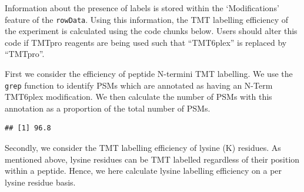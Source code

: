 \documentclass[9pt,a4paper,]{extarticle}
\newenvironment{Shaded}{\begin{snugshade}}{\end{snugshade}}
\newcommand{\AttributeTok}[1]{\textcolor[rgb]{0.77,0.63,0.00}{#1}}
\newcommand{\DecValTok}[1]{\textcolor[rgb]{0.00,0.00,0.81}{#1}}
\newcommand{\DocumentationTok}[1]{\textcolor[rgb]{0.56,0.35,0.01}{\textbf{\textit{#1}}}}
\newcommand{\FunctionTok}[1]{\textcolor[rgb]{0.00,0.00,0.00}{#1}}
\newcommand{\NormalTok}[1]{#1}
\newcommand{\OtherTok}[1]{\textcolor[rgb]{0.56,0.35,0.01}{#1}}
\newcommand{\SpecialCharTok}[1]{\textcolor[rgb]{0.00,0.00,0.00}{#1}}
\newcommand{\StringTok}[1]{\textcolor[rgb]{0.31,0.60,0.02}{#1}}
\begin{document}
Information about the presence of labels is stored within the `Modifications'
feature of the \texttt{rowData}. Using this information, the TMT labelling efficiency
of the experiment is calculated using the code chunks below. Users should alter
this code if TMTpro reagents are being used such that ``TMT6plex'' is replaced by
``TMTpro''.

First we consider the efficiency of peptide N-termini TMT labelling. We use the
\texttt{grep} function to identify PSMs which are annotated as having an N-Term TMT6plex
modification. We then calculate the number of PSMs with this annotation as a
proportion of the total number of PSMs.

\begin{Shaded}
\end{Shaded}

\begin{verbatim}
## [1] 96.8
\end{verbatim}

Secondly, we consider the TMT labelling efficiency of lysine (K) residues. As
mentioned above, lysine residues can be TMT labelled regardless of their
position within a peptide. Hence, we here calculate lysine labelling efficiency
on a per lysine residue basis.
\end{document}
